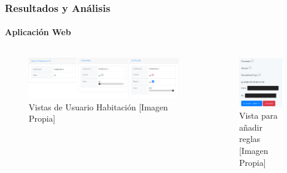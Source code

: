 \begin{frame}[t]
\frametitle{Resultados y Análisis}
\framesubtitle{Aplicación Web}
\begin{columns}[t]
	\begin{figure}[!]
		\centering
		\caption{Vistas de Usuario Habitación [Imagen Propia]}
		\label{fig:userview}
		\includegraphics[width=\linewidth]{Imagenes/R_App}
	\end{figure}

	\begin{figure}[!]
		\centering
		\caption{Vista para añadir reglas [Imagen Propia]}
		\label{fig:rulesview}
		\includegraphics[width=0.7\linewidth]{Imagenes/rules_view}
	\end{figure}
\end{columns}
\end{frame}

